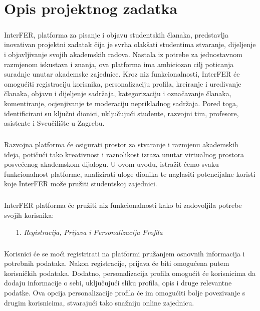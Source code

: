 \chapter{Opis projektnog zadatka}

\paragraph{}
InterFER, platforma za pisanje i objavu studentskih članaka, predstavlja
inovativan projektni zadatak čija je svrha olakšati studentima stvaranje,
dijeljenje i objavljivanje svojih akademskih radova. Nastala iz potrebe
za jednostavnom razmjenom iskustava i znanja, ova platforma ima
ambiciozan cilj poticanja suradnje unutar akademske zajednice. Kroz niz
funkcionalnosti, InterFER će omogućiti registraciju korisnika,
personalizaciju profila, kreiranje i uređivanje članaka, objavu i
dijeljenje sadržaja, kategorizaciju i označavanje članaka, komentiranje,
ocjenjivanje te moderaciju neprikladnog sadržaja. Pored toga,
identificirani su ključni dionici, uključujući studente, razvojni tim,
profesore, asistente i Sveučilište u Zagrebu.

\paragraph{}
Razvojna platforma će osigurati prostor za stvaranje i razmjenu akademskih
ideja, potičući tako kreativnost i raznolikost izraza unutar virtualnog
prostora posvećenog akademskom dijalogu. U ovom uvodu, istražit ćemo
svaku funkcionalnost platforme, analizirati uloge dionika te naglasiti
potencijalne koristi koje InterFER može pružiti studentskoj zajednici.

\paragraph{}
InterFER platforma će pružiti niz funkcionalnosti kako bi zadovoljila
potrebe svojih korisnika:

\begin{enumerate}
	\item[1.] \textit{Registracija, Prijava i Personalizacija Profila}
\end{enumerate}

\paragraph{}
Korisnici će se moći registrirati na platformi pružanjem
osnovnih informacija i potrebnih podataka. Nakon
registracije, prijava će biti omogućena putem korisničkih
podataka. Dodatno, personalizacija profila omogućit će
korisnicima da dodaju informacije o sebi, uključujući
sliku profila, opis i druge relevantne podatke. Ova opcija
personalizacije profila će im omogućiti bolje povezivanje
s drugim korisnicima, stvarajući tako snažniju online
zajednicu.

